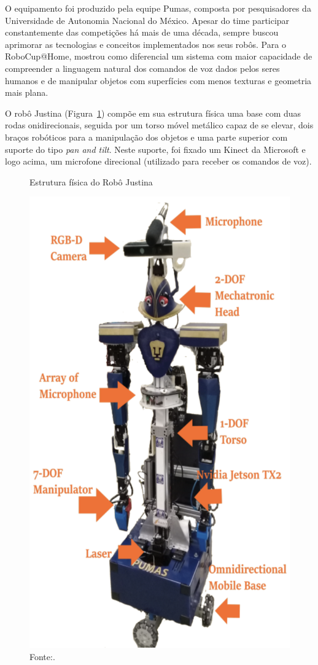 O equipamento foi produzido pela equipe Pumas, composta por pesquisadores da Universidade de Autonomia Nacional do México. Apesar do time participar constantemente das competições há mais de uma década, sempre buscou aprimorar as tecnologias e conceitos implementados nos seus robôs. Para o RoboCup@Home, mostrou como diferencial um sistema com maior capacidade de compreender a linguagem natural dos comandos de voz dados pelos seres humanos e de manipular objetos com superfícies com menos texturas e geometria mais plana.

O robô Justina (Figura~\ref{fig:justina}) compõe em sua estrutura física uma base com duas rodas onidirecionais, seguida por um torso móvel  metálico capaz de se elevar, dois braços robóticos para a manipulação dos objetos e uma parte superior com suporte do tipo \textit{pan and tilt}. Neste suporte, foi fixado um Kinect da Microsoft e logo acima, um microfone direcional (utilizado para receber os comandos de voz). 

\begin{figure}[H]
    \centering
    \caption{Estrutura física do Robô Justina}
    \includegraphics[scale=0.4]{justina.png}
    \caption*{Fonte:\citet{justina:2019}.}
    \label{fig:justina}
\end{figure}

